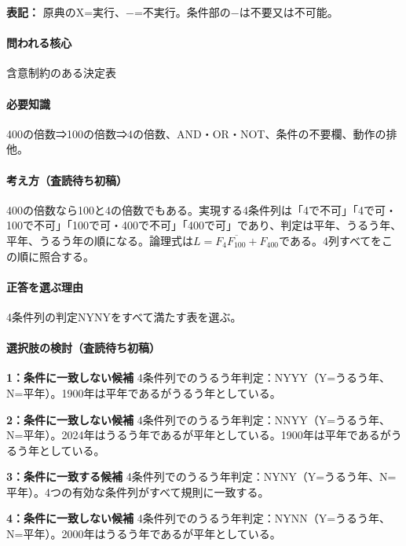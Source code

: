 \noindent\textbf{表記：} 原典のX=実行、−=不実行。条件部の−は不要又は不可能。\par

\paragraph{問われる核心} 含意制約のある決定表

\paragraph{必要知識} 400の倍数⇒100の倍数⇒4の倍数、AND・OR・NOT、条件の不要欄、動作の排他。

\paragraph{考え方（査読待ち初稿）} 400の倍数なら100と4の倍数でもある。実現する4条件列は「4で不可」「4で可・100で不可」「100で可・400で不可」「400で可」であり、判定は平年、うるう年、平年、うるう年の順になる。論理式は\(L=F_4\overline{F_{100}}+F_{400}\)である。4列すべてをこの順に照合する。

\paragraph{正答を選ぶ理由} 4条件列の判定NYNYをすべて満たす表を選ぶ。

\paragraph{選択肢の検討（査読待ち初稿）}\mbox{}\par

\noindent\textbf{1：条件に一致しない候補} 4条件列でのうるう年判定：NYYY（Y=うるう年、N=平年）。1900年は平年であるがうるう年としている。\par

\noindent\textbf{2：条件に一致しない候補} 4条件列でのうるう年判定：NNYY（Y=うるう年、N=平年）。2024年はうるう年であるが平年としている。1900年は平年であるがうるう年としている。\par

\noindent\textbf{3：条件に一致する候補} 4条件列でのうるう年判定：NYNY（Y=うるう年、N=平年）。4つの有効な条件列がすべて規則に一致する。\par

\noindent\textbf{4：条件に一致しない候補} 4条件列でのうるう年判定：NYNN（Y=うるう年、N=平年）。2000年はうるう年であるが平年としている。\par

